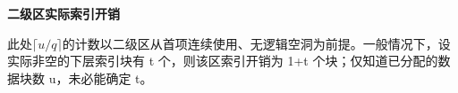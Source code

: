 {\color{ink}\bfseries 二级区实际索引开销}\par\vspace{1bp}此处\(\lceil u/\allowbreak{}q\rceil \)的计数以二级区从首项连续使用、无逻辑空洞为前提。一般情况下，设实际非空的下层索引块有 t 个，则该区索引开销为 1+\allowbreak{}t 个块；仅知道已分配的数据块数 u，未必能确定 t。
